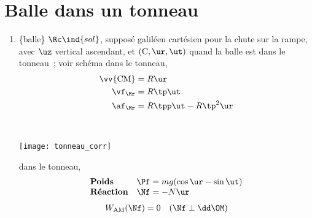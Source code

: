 \documentclass[a4paper, 12pt, final, garamond]{book}
\begin{document}
\section{Balle dans un tonneau}
\begin{enumerate}
    \item 
        \begin{minipage}[t]{0.65\linewidth}
            \begin{itemize}[label=$\diamond$, leftmargin=10pt]
                 \{balle\}
                 $\Rc\ind{sol}$, supposé galiléen
                 cartésien pour la chute sur la rampe, avec $\uz$
                    vertical ascendant, et $({\rm C}, \ur, \ut)$ quand la balle est
                    dans le tonneau~; voir schéma
                 dans le tonneau,
                    \begin{align*}
                        \vv{\rm CM} &= R\ur\\
                        \vf_{\Mr} &= R\tp\ut\\
                        \af_{\Mr} &= R\tpp\ut -R\tp^2\ur
                    \end{align*}
            \end{itemize}
        \end{minipage}
        \hfill
        \begin{minipage}[t]{0.30\linewidth}
            ~
            \begin{center}
                \texttt{[image: tonneau\_corr]}
                \captionsetup{justification=centering}
                \label{fig:tonneau_corr}
            \end{center}
        \end{minipage}
        \begin{itemize}[label=$\diamond$, leftmargin=10pt]
             dans le tonneau,
                \[
                    \begin{array}{ll}
                        \textbf{Poids} & \Pf = mg(\cos\tt\ur-\sin\tt\ut)\\
                        \textbf{Réaction} & \Nf = -N\ur
                    \end{array}
                \]
                \begin{align*}
                    W_{\rm AM}(\Nf) &= 0 \quad (\Nf\perp\dd\OM)\\

\end{align*}
\end{itemize}
\end{enumerate}
\end{document}
